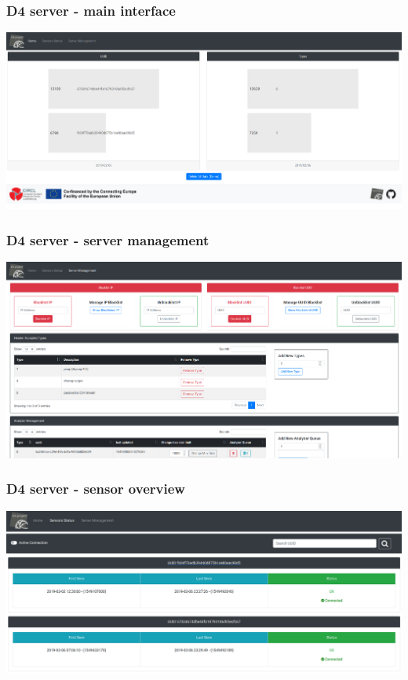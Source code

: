 \documentclass{beamer}
\begin{document}
\begin{frame}
        \frametitle{D4 server - main interface}
        \includegraphics[scale=0.18]{d4-4.png}
\end{frame}

\begin{frame}
        \frametitle{D4 server - server management}
        \includegraphics[scale=0.18]{d4-3.png}
\end{frame}

\begin{frame}
        \frametitle{D4 server - sensor overview}
        \includegraphics[scale=0.18]{d4-1.png}
\end{frame}
\end{document}
